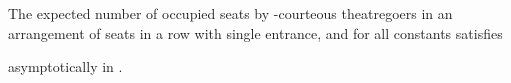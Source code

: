 \documentclass[11pt]{llncs}
\begin{document}
\begin{comment}
Next we give the recurrence
for the Zipf distribution 
with right bias.
\begin{theorem}[Zipf with right bias]
\label{thm2zipfr}
The expected number of occupied seats by -courteous theatregoers
in an arrangement of  seats
in a row with single entrance is equal to , asymptotically in .
\end{theorem}
\begin{proof}
Let  be the expected number of theatregoers occupying seats 
in a row of  seats,
when seating is biased to the right,
Observe that  and that the following recurrence is valid
for all .

It turns out that
for this case the recurrence
is harder to solve.
\qed
\end{proof}
\end{comment}




\begin{theorem}
\label{thm2zipfr}
The expected number  of occupied seats by -courteous theatregoers
in an arrangement of  seats
in a row with single entrance, and for all constants  satisfies 

asymptotically in .
\end{theorem}
\end{document}

